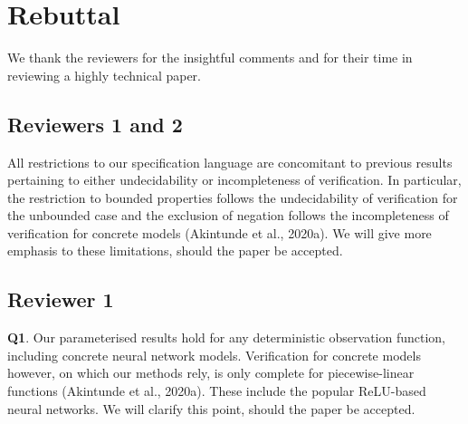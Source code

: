 \documentclass{article}
\begin{document}




\section*{Rebuttal}
We thank the reviewers for the insightful comments and for their time in
reviewing a highly technical paper.


\subsection*{Reviewers 1 and 2}
All restrictions to our specification language are concomitant to previous
results pertaining to either undecidability or incompleteness of verification.
In particular, the restriction to bounded properties follows the undecidability
of verification for the unbounded case and the exclusion of negation follows
the incompleteness of verification for concrete models (Akintunde et al.,
2020a). We will give more emphasis to these limitations, should the paper be
accepted.

\subsection*{Reviewer 1} 

\textbf{Q1}.  Our parameterised results hold for  any deterministic observation
function, including concrete neural network models. Verification for concrete
models however, on which our methods rely, is only complete for
piecewise-linear functions (Akintunde et al., 2020a). These include the popular
ReLU-based neural networks. We will clarify this point, should the paper be
accepted.
\end{document}
